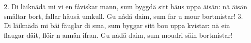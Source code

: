2.  Di läiknädä mi vi en fåviskar mann,
    sum byggdä sitt häus uppa äisän:
    nä äisän smältar bort, fallar häusä umkull.
    Gu nådä daim, sum far u mour bortmistar!
3.  Di läiknädä mi bäi fäuglar di sma,
    sum byggar sitt bou uppa kvistar:
    nä ein flaugar däit, flöir n annän ifran.
    Gu nådä daim, sum moudri säin bortmistar!
